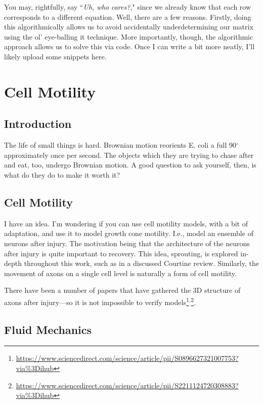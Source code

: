 \documentclass[12pt]{report}
\begin{document}
You may, rightfully, say ``\textit{Uh, who cares?}," since we already know that each row corresponds to a different equation. Well, there are a few reasons. Firstly, doing this algorithmically allows us to avoid accidentally underdetermining our matrix using the ol' eye-balling it technique. More importantly, though, the algorithmic approach allows us to solve this via code. Once I can write a bit more neatly, I'll likely upload some snippets here. 



\chapter{Cell Motility}

\section{Introduction}

The life of small things is hard. Brownian motion reorients E. coli a full 90$^\circ$ approximately once per second. The objects which they are trying to chase after and eat, too, undergo Brownian motion. A good question to ask yourself, then, is what do they do to make it worth it?

\section{Cell Motility}

I have an idea. I'm wondering if you can use cell motility models, with a bit of adaptation, and use it to model growth cone motility. I.e., model an ensemble of neurons after injury. The motivation being that the architecture of the neurons after injury is quite important to recovery. This idea, sprouting, is explored in-depth throughout this work, such as in a discussed Courtine review. Similarly, the movement of axons on a single cell level is naturally a form of cell motility. \newline

There have been a number of papers that have gathered the 3D structure of axons after injury---so it is not impossible to verify models\footnote{\url{https://www.sciencedirect.com/science/article/pii/S0896627321007753?via\%3Dihub}}$^,$\footnote{\url{https://www.sciencedirect.com/science/article/pii/S2211124720308883?via\%3Dihub}}. 


\section{Fluid Mechanics}
\end{document}
